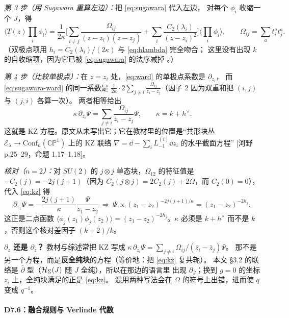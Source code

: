 \emph{第 3 步（用 Sugawara 重算左边）：}把 \eqref{eq:sugawara} 代入左边，
对每个 $\phi_i$ 收缩一个 $J$，得
\begin{equation}
\langle T(z)\prod_i\phi_i\rangle
=\frac{1}{2\kappa}\Big[\sum_{i\ne j}\frac{\Omega_{ij}}{(z-z_i)(z-z_j)}
+\sum_i\frac{C_2(\lambda_i)}{(z-z_i)^2}\Big]\langle\prod_i\phi_i\rangle ,
\qquad \Omega_{ij}=\sum_a t^a_it^a_j .
\label{eq:sugawara-ward}
\end{equation}
（双极点项用 $h_i=C_2(\lambda_i)/(2\kappa)$ 与 \eqref{eq:hlambda} 完全吻合；
这里没有出现 $k$ 的自收缩项，因为它已被 \eqref{eq:sugawara} 的法序减掉 \ours。）

\emph{第 4 步（比较单极点）：}在 $z=z_i$ 处，\eqref{eq:ward} 的单极点系数是 $\partial_{z_i}$，
而 \eqref{eq:sugawara-ward} 的同一系数是
$\frac{1}{2\kappa}\cdot2\sum_{j\ne i}\frac{\Omega_{ij}}{z_i-z_j}$（因子 2 因为双重和把 $(i,j)$ 与 $(j,i)$ 各算一次）。
两者相等给出
\begin{equation}
\kappa\,\partial_{z_i}\Psi=\sum_{j\ne i}\frac{\Omega_{ij}}{z_i-z_j}\Psi,
\qquad \kappa=k+h^\vee .
\label{eq:kz}
\end{equation}
这就是 KZ 方程。原文从未写出它；它在教材里的位置是“共形块丛 $\mathcal{E}_\lambda\to\mathrm{Conf}_n(\mathbb{CP}^1)$
上的 KZ 联络 $\nabla=\dd-\sum_iL^{(i)}_{-1}\dd z_i$ 的水平截面方程”
[河野 p.25--29，命题 1.17--1.18]。

\emph{核对（$n=2$）：}对 $SU(2)$ 的 $j\otimes j$ 单态块，$\Omega_{12}$ 的特征值是
$-C_2(j)=-2j(j+1)$（因为 $C_2(j\otimes j)=2C_2(j)+2\Omega$，而 $C_2(0)=0$），
代入 \eqref{eq:kz} 得
\[
\partial_{z_1}\Psi=-\frac{2j(j+1)}{\kappa}\frac{\Psi}{z_1-z_2}
\ \Longrightarrow\
\Psi\propto(z_1-z_2)^{-2j(j+1)/\kappa}=(z_1-z_2)^{-2h_j},
\]
这正是二点函数 $\langle\phi_j(z_1)\phi_j(z_2)\rangle=(z_1-z_2)^{-2h_j}$。$\kappa$ 必须是
$k+h^\vee$ 而不是 $k$，否则这个核对差因子 $(k+2)/k$。\ours

\begin{keypoint}
\textbf{$\partial_z$ 还是 $\partial_{\bar z}$？} 教材与综述常把 KZ 写成
$\kappa\,\partial_{\bar z_i}\Psi=\sum_{j\ne i}\Omega_{ij}/(\bar z_i-\bar z_j)\Psi$。
那不是另一个方程，而是\textbf{反全纯块}的方程（等价地：把 \eqref{eq:kz} 复共轭）。
本文 \S3.2 的联络是 $\bar\partial$ 型（$\mathcal{H}_\Sigma(J)$ 随 $J$ 全纯），所以在那边的语言里
出现 $\partial_{\bar J}$；换到 $g=0$ 的坐标 $z_i$ 上，全纯块满足的正是 \eqref{eq:kz}。
混用两种写法会在 $\Omega$ 的符号上出错，进而使 $q$ 变成 $q^{-1}$。
\end{keypoint}

\paragraph{D7.6：融合规则与 Verlinde 代数}

